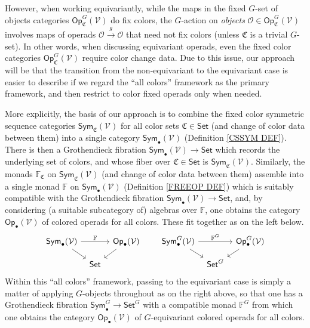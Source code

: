 \documentclass[a4paper,10pt
,draft
]{article}%
\numberwithin{equation}{section}
\numberwithin{figure}{section}
\theoremstyle{definition} %
\newcommand{\Sym}{\ensuremath{\mathsf{Sym}}}%
\newcommand{\Op}{\mathsf{Op}}%
\newcommand{\V}{\ensuremath{\mathcal V}}
\renewcommand{\O}{\ensuremath{\mathcal O}}
\newcommand{\1}{\ensuremath{\mathbbm 1}}%
\begin{document}
However, when working equivariantly, 
while the maps in the fixed $G$-set of objects categories 
$\mathsf{Op}^G_{\mathfrak{C}}(\V)$ do fix colors, 
the $G$-action on \emph{objects}
$\O \in \mathsf{Op}^G_{\mathfrak{C}}(\V)$
involves maps of operads $\O \xrightarrow{g} \O$
that need not fix colors (unless $\mathfrak{C}$ is a trivial $G$-set).
In other words, when discussing equivariant operads,
even the fixed color categories 
$\mathsf{Op}^G_{\mathfrak{C}}(\V)$
require color change data.
Due to this issue, 
our approach will be that the transition from the non-equivariant to the equivariant case is easier to describe 
if we regard the ``all colors'' framework as the primary framework,
and then restrict to color fixed operads only when needed.

More explicitly, the basis of our approach is to combine the 
fixed color symmetric sequence categories
$\mathsf{Sym}_{\mathfrak{C}}(\V)$ for all color sets 
$\mathfrak{C} \in \mathsf{Set}$
(and change of color data between them)
into a single category $\mathsf{Sym}_{\bullet}(\V)$
(Definition \ref{CSSYM DEF}).
There is then a Grothendieck fibration
$\mathsf{Sym}_{\bullet}(\V) \to \mathsf{Set}$
which records the underlying set of colors,
and whose fiber over $\mathfrak{C} \in \mathsf{Set}$ is 
$\mathsf{Sym}_{\mathfrak{C}}(\V)$.
Similarly, the monads $\mathbb{F}_{\mathfrak{C}}$
on $\mathsf{Sym}_{\mathfrak{C}}(\mathcal{V})$
(and change of color data between them) 
assemble into a single monad $\mathbb{F}$
on $\mathsf{Sym}_{\bullet}(\V)$
(Definition \ref{FREEOP DEF})
which is suitably compatible with 
the Grothendieck fibration 
$\mathsf{Sym}_{\bullet}(\V) \to \mathsf{Set}$,
and, by considering (a suitable subcategory of) algebras over $\mathbb{F}$,
one obtains the category $\mathsf{Op}_{\bullet}(\V)$
of colored operads for all colors.
These fit together as on the left below.
\begin{equation}\label{FIBADJMON EQ}
\begin{tikzcd}[row sep = small, column sep = tiny]
\Sym_\bullet(\V) \arrow[rr, "\mathbb F"] \arrow[dr]
&&
\Op_\bullet(\V) \arrow[dl]
&&& %
\Sym^G_\bullet(\V) \arrow[rr, "\mathbb F^G"] \arrow[dr]
&&
\Op^G_\bullet(\V) \arrow[dl]
\\
&
\mathsf{Set}
&
&&& %
&
\mathsf{Set}^G
\end{tikzcd}
\end{equation}
Within this ``all colors'' framework, passing to the equivariant case is simply a matter of applying $G$-objects throughout as on the right above, 
so that one has a Grothendieck fibration
$\mathsf{Sym}_{\bullet}^G \to \mathsf{Set}^G$
with a compatible monad $\mathbb{F}^G$
from which one obtains the category 
$\mathsf{Op}_{\bullet}(\V)$
of $G$-equivariant colored operads for all colors. 
\end{document}
